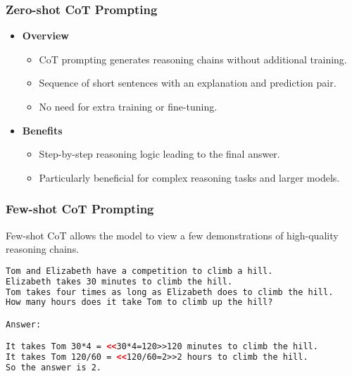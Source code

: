 \begin{frame}[fragile]\frametitle{Zero-shot CoT Prompting}

\begin{itemize}
  \item \textbf{Overview}
    \begin{itemize}
      \item CoT prompting generates reasoning chains without additional training.
      \item Sequence of short sentences with an explanation and prediction pair.
      \item No need for extra training or fine-tuning.
    \end{itemize}

  \item \textbf{Benefits}
    \begin{itemize}
      \item Step-by-step reasoning logic leading to the final answer.
      \item Particularly beneficial for complex reasoning tasks and larger models.
    \end{itemize}
\end{itemize}

\end{frame}

\begin{frame}[fragile]\frametitle{Few-shot CoT Prompting}

Few-shot CoT allows the model to view a few demonstrations of high-quality reasoning chains.

\begin{lstlisting}[language=HTML]
Tom and Elizabeth have a competition to climb a hill.
Elizabeth takes 30 minutes to climb the hill.
Tom takes four times as long as Elizabeth does to climb the hill.
How many hours does it take Tom to climb up the hill?

Answer:

It takes Tom 30*4 = <<30*4=120>>120 minutes to climb the hill.
It takes Tom 120/60 = <<120/60=2>>2 hours to climb the hill.
So the answer is 2.

\end{lstlisting} %


\end{frame}

